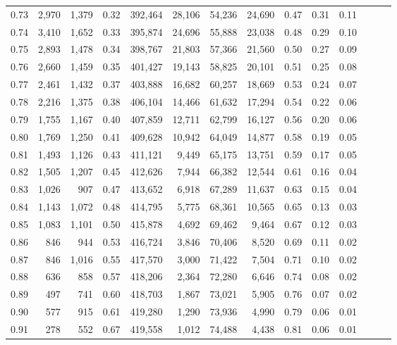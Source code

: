 \begin{tabular}{rrrrrrrrrrrrrr}
0.73 &  2,970 &  1,379 &  0.32 &  392,464 &   28,106 &  54,236 &  24,690 &  0.47 &  0.31 &      0.11 \\
0.74 &  3,410 &  1,652 &  0.33 &  395,874 &   24,696 &  55,888 &  23,038 &  0.48 &  0.29 &      0.10 \\
0.75 &  2,893 &  1,478 &  0.34 &  398,767 &   21,803 &  57,366 &  21,560 &  0.50 &  0.27 &      0.09 \\
0.76 &  2,660 &  1,459 &  0.35 &  401,427 &   19,143 &  58,825 &  20,101 &  0.51 &  0.25 &      0.08 \\
0.77 &  2,461 &  1,432 &  0.37 &  403,888 &   16,682 &  60,257 &  18,669 &  0.53 &  0.24 &      0.07 \\
0.78 &  2,216 &  1,375 &  0.38 &  406,104 &   14,466 &  61,632 &  17,294 &  0.54 &  0.22 &      0.06 \\
0.79 &  1,755 &  1,167 &  0.40 &  407,859 &   12,711 &  62,799 &  16,127 &  0.56 &  0.20 &      0.06 \\
0.80 &  1,769 &  1,250 &  0.41 &  409,628 &   10,942 &  64,049 &  14,877 &  0.58 &  0.19 &      0.05 \\
0.81 &  1,493 &  1,126 &  0.43 &  411,121 &    9,449 &  65,175 &  13,751 &  0.59 &  0.17 &      0.05 \\
0.82 &  1,505 &  1,207 &  0.45 &  412,626 &    7,944 &  66,382 &  12,544 &  0.61 &  0.16 &      0.04 \\
0.83 &  1,026 &    907 &  0.47 &  413,652 &    6,918 &  67,289 &  11,637 &  0.63 &  0.15 &      0.04 \\
0.84 &  1,143 &  1,072 &  0.48 &  414,795 &    5,775 &  68,361 &  10,565 &  0.65 &  0.13 &      0.03 \\
0.85 &  1,083 &  1,101 &  0.50 &  415,878 &    4,692 &  69,462 &   9,464 &  0.67 &  0.12 &      0.03 \\
0.86 &    846 &    944 &  0.53 &  416,724 &    3,846 &  70,406 &   8,520 &  0.69 &  0.11 &      0.02 \\
0.87 &    846 &  1,016 &  0.55 &  417,570 &    3,000 &  71,422 &   7,504 &  0.71 &  0.10 &      0.02 \\
0.88 &    636 &    858 &  0.57 &  418,206 &    2,364 &  72,280 &   6,646 &  0.74 &  0.08 &      0.02 \\
0.89 &    497 &    741 &  0.60 &  418,703 &    1,867 &  73,021 &   5,905 &  0.76 &  0.07 &      0.02 \\
0.90 &    577 &    915 &  0.61 &  419,280 &    1,290 &  73,936 &   4,990 &  0.79 &  0.06 &      0.01 \\
0.91 &    278 &    552 &  0.67 &  419,558 &    1,012 &  74,488 &   4,438 &  0.81 &  0.06 &      0.01 \\

\end{tabular}
